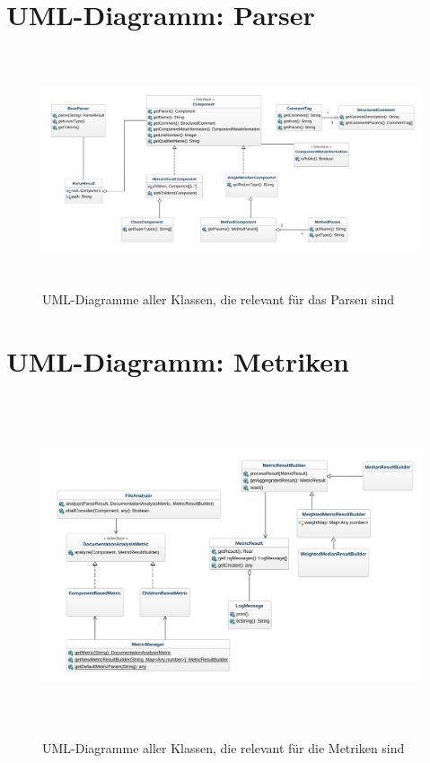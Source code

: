 \begin{appendices}
\chapter{UML-Diagramm: Parser}
\begin{figure}[ht!]
    \centering
    \includegraphics[height=7cm,keepaspectratio,angle=90]{figures/uml/parsing.png}
    \caption{UML-Diagramme aller Klassen, die relevant für das Parsen sind}
    \label{fig:uml_parsing}
\end{figure}
\chapter{UML-Diagramm: Metriken}
\begin{figure}[ht!]
    \centering
    \includegraphics[height=10cm,keepaspectratio,angle=90]{figures/uml/metriken.png}
    \caption{UML-Diagramme aller Klassen, die relevant für die Metriken sind}
    \label{fig:uml_metrics}
\end{figure}
\end{appendices}
	
